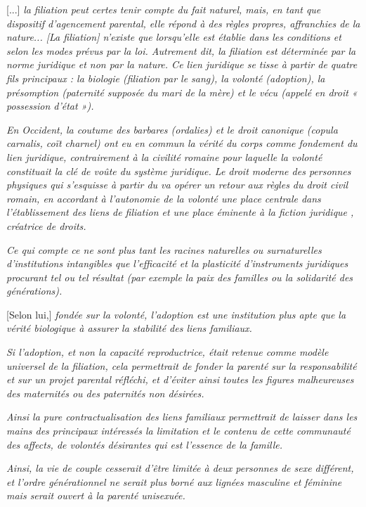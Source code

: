 \begin{displayquote}

[...] \emph{la filiation peut certes tenir compte du fait naturel, mais, en tant que dispositif d'agencement parental, elle répond à des règles propres, affranchies de la nature... \emph{[La filiation]} n'existe que lorsqu'elle est établie dans les conditions et selon les modes prévus par la loi. Autrement dit, la filiation est déterminée par la norme juridique et non par la nature. Ce lien juridique se tisse à partir de quatre fils principaux : la biologie (filiation par le sang), la volonté (adoption), la présomption (paternité supposée du mari de la mère) et le vécu (appelé en droit « possession d'état »).}

\emph{En Occident, la coutume des barbares (ordalies) et le droit canonique (\emph{copula carnalis}, coït charnel) ont eu en commun la vérité du corps comme fondement du lien juridique, contrairement à la civilité romaine pour laquelle la volonté constituait la clé de voûte du système juridique. Le droit moderne des personnes physiques qui s'esquisse à partir du  va opérer un retour aux règles du droit civil romain, en accordant à l'autonomie de la volonté une place centrale dans l'établissement des liens de filiation et une place éminente à la fiction juridique , créatrice de droits.}
 
\emph{Ce qui compte ce ne sont plus tant les racines naturelles ou surnaturelles d'institutions intangibles que l'efficacité et la plasticité d'instruments juridiques procurant tel ou tel résultat (par exemple la paix des familles ou la solidarité des générations).}
 
 [Selon lui,] \emph{fondée sur la volonté, l'adoption est une institution plus apte que la vérité biologique à assurer la stabilité des liens familiaux.}
  
\emph{Si l'adoption, et non la capacité reproductrice, était retenue comme modèle universel de la filiation, cela permettrait de fonder la parenté sur la responsabilité et sur un projet parental réfléchi, et d'éviter ainsi toutes les figures malheureuses des maternités ou des paternités non désirées.}
 
\emph{Ainsi la pure contractualisation des liens familiaux permettrait de laisser dans les mains des principaux intéressés la limitation et le contenu de cette communauté des affects, de volontés désirantes qui est l'essence de la famille.}
 
\emph{Ainsi, la vie de couple cesserait d'être limitée à deux personnes de sexe différent, et l'ordre générationnel ne serait plus borné aux lignées masculine et féminine mais serait ouvert à la parenté unisexuée.}
 

\end{displayquote}
